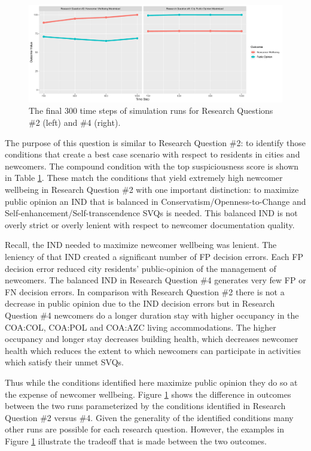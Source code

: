 \documentclass{scspaperproc}
\theoremstyle{scsthe}
\begin{document}
\begin{figure}[htb]
{
\centering
\includegraphics[width=0.95\columnwidth]{WellbeingVsPublicOpinion.pdf}
\caption{The final 300 time steps of simulation runs for Research Questions \#2 (left) and \#4 (right).}
\label{fig:wellbeingvspo}
}
\end{figure}


The purpose of this question is similar to Research Question \#2: to identify those conditions that create a best case scenario with respect to residents in cities and newcomers. The compound condition with the top suspiciousness score is shown in Table \ref{fig:wellbeingvspo}. These match the conditions that yield extremely high newcomer wellbeing in Research Question \#2 with one important distinction: to maximize public opinion an IND that is balanced in Conservatism/Openness-to-Change and Self-enhancement/Self-transcendence SVQs is needed. This balanced IND is not overly strict or overly lenient with respect to newcomer documentation quality. 

Recall, the IND needed to maximize newcomer wellbeing was lenient.  The leniency of that IND created a significant number of FP decision errors. Each FP decision error reduced city residents' public-opinion of the management of newcomers. The balanced IND in Research Question \#4 generates very few FP or FN decision errors. In comparison with Research Question \#2 there is not a decrease in public opinion due to the IND decision errors but in Research Question \#4 newcomers do a longer duration stay with higher occupancy in the COA:COL, COA:POL and COA:AZC living accommodations. The higher occupancy and longer stay decreases building health, which decreases newcomer health which reduces the extent to which newcomers can participate in activities which satisfy their unmet SVQs. 

Thus while the conditions identified here maximize public opinion they do so at the expense of newcomer wellbeing. Figure \ref{fig:wellbeingvspo} shows the difference in outcomes between the two runs parameterized by the conditions identified in Research Question \#2 versus \#4. Given the generality of the identified conditions many other runs are possible for each research question. However, the examples in Figure \ref{fig:wellbeingvspo} illustrate the tradeoff that is made between the two outcomes. 
\end{document}
